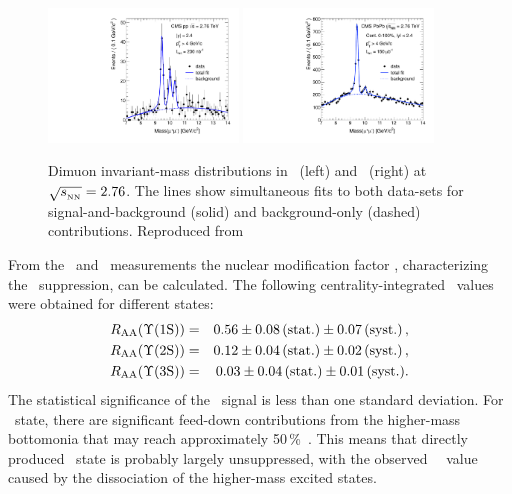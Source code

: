 \begin{figure}
\begin{center}
    \includegraphics[width=0.45\textwidth]{quarkoniafigs/ppFitPt4Erf}
    \includegraphics[width=0.45\textwidth]{quarkoniafigs/hiFitPt4Erf}
    \label{fig:KS:mass}
    \caption{Dimuon invariant-mass distributions in \PbPb\ (left) and \pp\ (right)
at $\sqrt{s_{_{\rm NN}}} = 2.76$\TeV. The lines show simultaneous fits to both
data-sets for signal-and-background (solid) and background-only (dashed) contributions.
Reproduced from~\cite{Chatrchyan:2012lxa}}
\end{center}
\end{figure}

From the \PbPb\ and \pp\ measurements the nuclear modification factor \Raa, characterizing the \PgU\ suppression,
can be calculated. The following centrality-integrated \Raa\ values were obtained for different \PgUn states:
\begin{eqnarray}
R_\mathrm{AA} (\Upsilon\mathrm{(1S)}) &=& 0.56 \pm 0.08\,\mbox{(stat.)} \pm 0.07\,\mbox{(syst.)} \,, \nonumber \\
R_\mathrm{AA} (\Upsilon\mathrm{(2S)}) &=& 0.12 \pm 0.04\,\mbox{(stat.)} \pm 0.02\,\mbox{(syst.)} \,,  \\
R_\mathrm{AA} (\Upsilon\mathrm{(3S)}) &=& 0.03 \pm 0.04\,\mbox{(stat.)} \pm 0.01\,\mbox{(syst.)} .  \nonumber
\end{eqnarray}
The statistical significance of the \PgUc\ signal is less than one standard deviation.
For \PgUa\ state, there are significant feed-down contributions from the higher-mass bottomonia that may reach approximately 50\,\%~\cite{Affolder:1999wm, Aaij:2012se}.
This means that directly produced \PgUa\ state is probably largely unsuppressed, with
the observed \PgUa\ \Raa\ value caused by the dissociation of the higher-mass excited states.


